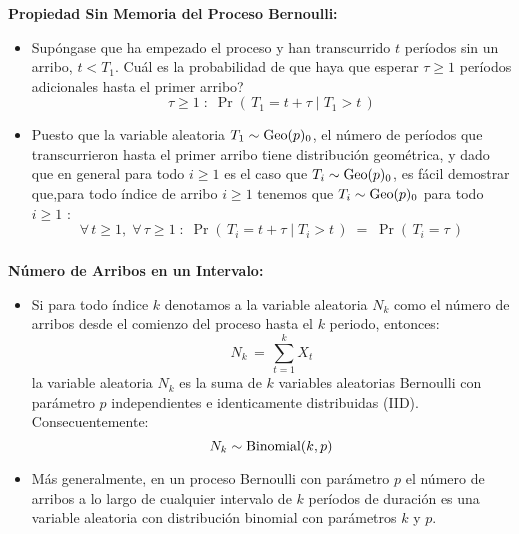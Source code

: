 \documentclass[ 10pt, xcolor = dvipsnames]{beamer}
\begin{document}
\begin{frame}[allowframebreaks]
\frametitle{\insertsection}

\textbf{Propiedad Sin Memoria del Proceso Bernoulli:}
\begin{itemize}
\item Sup\'ongase que ha empezado el proceso y han transcurrido $t$ per\'iodos sin un arribo, \ie $t < T_1$. Cu\'al es la probabilidad de que haya que esperar $\tau \geq 1$ per\'iodos adicionales hasta el primer arribo? \Iec
\[
\tau \geq 1 \; \colon \; \Pr( \, T_1 = t + \tau \mid T_1 > t \, )
\]
\item Puesto que la variable aleatoria $T_1 \sim \text{Geo}(p)_0$, \ie el n\'umero de per\'iodos que transcurrieron hasta el primer arribo tiene distribuci\'on geom\'etrica, y dado que en general para todo $i \geq 1$ es el caso que $T_i \sim \text{Geo}(p)_0$, es f\'acil demostrar que,para todo \'indice de arribo $i \geq 1$ tenemos que $T_i \sim \text{Geo}(p)_0$ para todo $i \geq 1$ : 
\[
\forall \, t \geq 1, \; \forall \, \tau \geq 1 \; \colon \;
\Pr( \, T_i = t + \tau \mid T_i > t \, ) \; = \;
\Pr( \, T_i = \tau \, )
\]
\end{itemize}

\end{frame}

\begin{frame}[allowframebreaks]
\frametitle{\insertsection}

\textbf{N\'umero de Arribos en un Intervalo:}
\begin{itemize}
\item Si para todo \'indice $k$ denotamos a la variable aleatoria $N_k$ como el n\'umero \linebreak de arribos desde el comienzo del proceso hasta el $k$ periodo, entonces: 
\[
N_k \, = \, \sum_{t=1}^k X_t
\]
\Ie la variable aleatoria $N_k$ es la suma de $k$ variables aleatorias Bernoulli con par\'ametro $p$ independientes e identicamente distribuidas (IID). Consecuentemente: 
\[
N_k \sim \text{Binomial}(k,p)
\]
\item M\'as generalmente, en un proceso Bernoulli con par\'ametro $p$ el n\'umero de arribos a lo largo de cualquier intervalo de $k$ per\'iodos de duraci\'on es una variable aleatoria con distribuci\'on binomial con par\'ametros $k$ y $p$. 
\end{itemize}

\end{frame}
\end{document}
